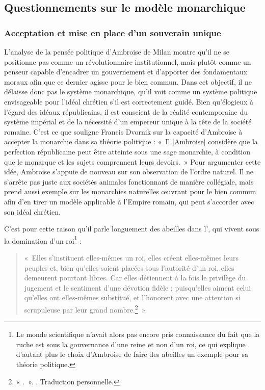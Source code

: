 \bigskip

\subsection{Questionnements sur le modèle monarchique}

\subsubsection{Acceptation et mise en place d'un souverain unique}

L'analyse de la pensée politique d'Ambroise de Milan montre qu'il ne se positionne pas comme un révolutionnaire institutionnel, mais plutôt comme un penseur capable d'encadrer un gouvernement et d'apporter des fondamentaux moraux afin que ce dernier agisse pour le bien commun. Dans cet objectif, il ne délaisse donc pas le système monarchique, qu'il voit comme un système politique envisageable pour l'idéal chrétien s'il est correctement guidé. Bien qu'élogieux à l'égard des idéaux républicains, il est conscient de la réalité contemporaine du système impérial et de la nécessité d'un empereur unique à la tête de la société romaine. C'est ce que souligne Francis Dvornik sur la capacité d'Ambroise à accepter la monarchie dans sa théorie politique : «~Il [Ambroise] considère que la perfection républicaine peut être atteinte sous une sage monarchie, à condition que le monarque et les sujets comprennent leurs devoirs.\autocite[676]{dvornik_political}~» Pour argumenter cette idée, Ambroise s'appuie de nouveau sur son observation de l'ordre naturel. Il ne s'arrête pas juste aux sociétés animales fonctionnant de manière collégiale, mais prend aussi exemple sur les monarchies naturelles œuvrant pour le bien commun afin d'en tirer un modèle applicable à l'Empire romain, qui peut s'accorder avec son idéal chrétien.

\bigskip

C'est pour cette raison qu'il parle longuement des abeilles dans l', qui vivent sous la domination d'un roi\footnote{Le monde scientifique n'avait alors pas encore pris connaissance du fait que la ruche est sous la gouvernance d'une reine et non d'un roi, ce qui explique d'autant plus le choix d'Ambroise de faire des abeilles un exemple pour sa théorie politique.} :

\bigskip

\begin{quote}
    «~Elles s'instituent elles-mêmes un roi, elles créent elles-mêmes leurs peuples et, bien qu’elles soient placées sous l'autorité d'un roi, elles demeurent pourtant libres. Car elles détiennent à la fois le privilège du jugement et le sentiment d'une dévotion fidèle ; puisqu'elles aiment celui qu'elles ont elles-mêmes substitué, et l'honorent avec une attention si scrupuleuse par leur grand nombre.\footnote{« .~». \cite[\nopp V, 21, 68]{ambroise_csel_32_1}. Traduction personnelle.}~»
\end{quote}

